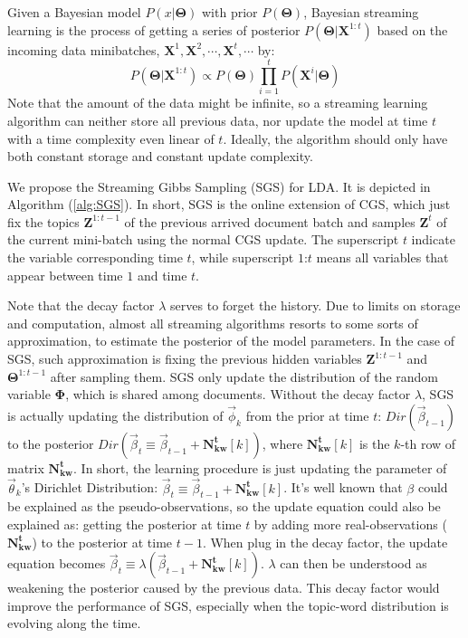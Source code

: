 \documentclass{article}
\begin{document}
Given a Bayesian model $P(x|\bm{\Theta})$ with prior $P(\bm{\Theta})$, Bayesian streaming learning is the process of getting a series of posterior $P(\bm{\Theta}|\bm{X}^{1:t})$ based on the incoming data minibatches, $\bm{X}^1, \bm{X}^2, \cdots, \bm{X}^t, \cdots$ by:
$$P(\bm{\Theta}|\bm{X}^{1:t})\propto P(\bm{\Theta}) \prod_{i=1}^t P(\bm{X}^i|\bm{\Theta})$$
Note that the amount of the data might be infinite, so a streaming learning algorithm can neither store all previous data, nor update the model at time $t$ with a time complexity even linear of $t$. Ideally, the algorithm should only have both constant storage and constant update complexity.

We propose the Streaming Gibbs Sampling (SGS) for LDA. It is depicted in Algorithm (\ref{alg:SGS}). In short, SGS is the online extension of CGS, which just fix the topics $\bm{Z}^{1:t-1}$ of the previous arrived document batch and samples $\bm{Z}^t$ of the current mini-batch using the normal CGS update. The superscript $t$ indicate the variable corresponding time $t$, while superscript $1$:$t$ means all variables that appear between time $1$ and time $t$.

Note that the decay factor $\lambda$ serves to forget the history. Due to limits on storage and computation, almost all streaming algorithms resorts to some sorts of approximation, to estimate the posterior of the model parameters. In the case of SGS, such approximation is fixing the previous hidden variables $\bm{Z}^{1:t-1}$ and $\bm{\Theta}^{1:t-1}$ after sampling them. SGS only update the distribution of the random variable $\bm{\Phi}$, which is shared among documents. Without the decay factor $\lambda$, SGS is actually updating the distribution of $\vec{\phi}_k$ from the prior at time $t$: $Dir(\vec{\beta}_{t-1})$ to the posterior $Dir(\vec{\beta}_t\equiv\vec{\beta}_{t-1}+\bm{N_{kw}^t}[k])$, where $\bm{N_{kw}^t}[k]$ is the $k$-th row of matrix $\bm{N_{kw}^t}$. In short, the learning procedure is just updating the parameter of $\vec{\theta}_k$'s Dirichlet Distribution: $\vec{\beta}_t\equiv\vec{\beta}_{t-1}+\bm{N_{kw}^t}[k]$. It's well known that $\beta$ could be explained as the pseudo-observations, so the update equation could also be explained as: getting the posterior at time $t$ by adding more real-observations ($\bm{N_{kw}^t}$) to the posterior at time $t-1$. When plug in the decay factor, the update equation becomes $\vec{\beta}_t\equiv \lambda (\vec{\beta}_{t-1}+\bm{N_{kw}^t}[k])$. $\lambda$ can then be understood as weakening the posterior caused by the previous data. This decay factor would improve the performance of SGS, especially when the topic-word distribution is evolving along the time.
\end{document}
